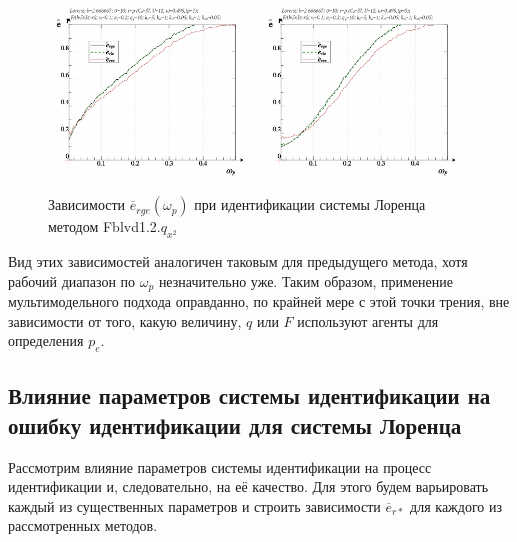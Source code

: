 \begin{figure}[h!]
  \centerline{
    \includegraphics[width=0.49\textwidth]{p/cha/lor/FAlv5.3z/lor_FAlv5_3z_qx2-p_omega_p_e_sign.png}
    \hfill
    \includegraphics[width=0.49\textwidth]{p/cha/lor/FAlv5.3z/lor_FAlv5_3z_qx2-p_omega_p_e_sin.png}
  }
  \caption{Зависимости $\overline{e}_{rge}(\omega_p)$ при идентификации системы Лоренца методом Fblvd1.2.$q_{x^2}$}
  \label{atu:f:lor_FAlv5.3r_e_omega_p}
\end{figure}

Вид этих зависимостей аналогичен таковым для предыдущего метода,
хотя рабочий диапазон по $\omega_p$ незначительно уже.
Таким образом, применение мультимодельного подхода
оправданно, по крайней мере с этой точки трения,
вне зависимости от того, какую величину, $q$ или $F$
используют агенты для определения $p_e$.


\subsection{Влияние параметров системы идентификации на ошибку идентификации для системы Лоренца}

Рассмотрим влияние параметров системы идентификации на
процесс идентификации и, следовательно, на её качество.
Для этого будем варьировать каждый из существенных
параметров и строить зависимости $\overline{e}_{r*}$
для каждого из рассмотренных методов.

